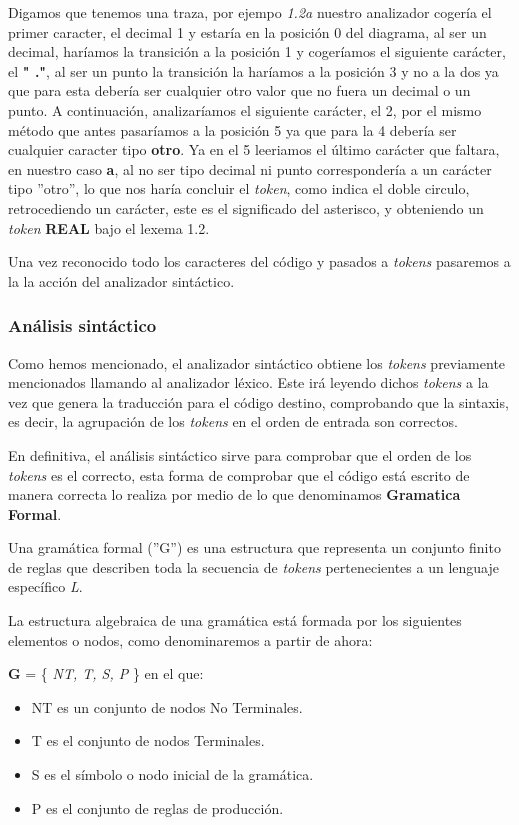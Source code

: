 \documentclass{article}
\begin{document}
    Digamos que tenemos una traza, por ejempo \textit{1.2a} nuestro analizador cogería el primer caracter, el decimal 1
    y estaría en la posición 0 del diagrama, al ser un decimal, haríamos la transición a la posición 1 y cogeríamos el siguiente
    carácter, el \textbf{" ."}, al ser un punto la transición la haríamos a la posición 3 y no a la dos ya que para esta debería ser
    cualquier otro valor que no fuera un decimal o un punto. A continuación, analizaríamos el siguiente carácter, el 2, por
    el mismo método que antes pasaríamos a la posición 5 ya que para la 4 debería ser cualquier caracter tipo \textbf{otro}. Ya
    en el 5 leeriamos el último carácter que faltara, en nuestro caso \textbf{a}, al no ser tipo decimal ni punto correspondería
    a un carácter tipo ''otro'', lo que nos haría concluir el \textit{token}, como indica el doble circulo, retrocediendo un carácter,
    este es el significado del asterisco, y obteniendo un \textit{token} \textbf{REAL} bajo el lexema 1.2.

    Una vez reconocido todo los caracteres del código y pasados a \textit{tokens} pasaremos a la la acción del analizador sintáctico.

    \subsubsection*{Análisis sintáctico}
    Como hemos mencionado, el analizador sintáctico obtiene los \textit{tokens} previamente mencionados llamando al analizador
    léxico. Este irá leyendo dichos \textit{tokens} a la vez que genera la traducción para el código destino, comprobando que la
    sintaxis, es decir, la agrupación de los \textit{tokens} en el orden de entrada son correctos.

    En definitiva, el análisis sintáctico sirve para comprobar que el orden de los \textit{tokens} es el correcto, esta forma de
    comprobar que el código está escrito de manera correcta lo realiza por medio de lo que denominamos  \textbf{Gramatica
    Formal}.

    Una gramática formal (''G'') es una estructura que representa un conjunto finito de reglas que describen
    toda la secuencia de \textit{tokens} pertenecientes a un lenguaje específico \textit{L}.

    La estructura algebraica de una gramática está formada por los siguientes elementos o nodos, como denominaremos a partir
    de ahora:

    \textbf{G} = \{ \textit{NT, T, S, P} \}
    en el que:
    \begin{itemize}
        \item NT es un conjunto de nodos No Terminales.
        \item T es el conjunto de nodos Terminales.
        \item S es el símbolo o nodo inicial de la gramática.
        \item P es el conjunto de reglas de producción.
    \end{itemize}
\end{document}
